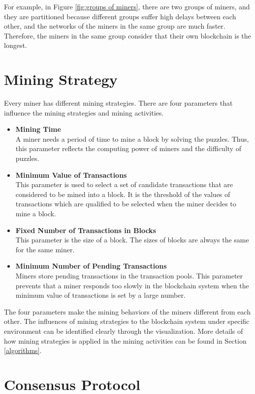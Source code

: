 For example, in Figure \ref{fig:groups of miners}, there are two groups of miners, and they are partitioned because different groups suffer high delays between each other, and the networks of the miners in the same group are much faster. Therefore, the miners in the same group consider that their own blockchain is the longest.

\section{Mining Strategy}

Every miner has different mining strategies. There are four parameters that influence the mining strategies and mining activities. 

\begin{itemize}
    \item \textbf{Mining Time} \\
        A miner needs a period of time to mine a block by solving the puzzles. Thus, this parameter reflects the computing power of miners and the difficulty of puzzles.
    \item \textbf{Minimum Value of Transactions} \\
        This parameter is used to select a set of candidate transactions that are considered to be mined into a block. It is the threshold of the values of transactions which are qualified to be selected when the miner decides to mine a block.
    \item \textbf{Fixed Number of Transactions in Blocks} \\
        This parameter is the size of a block. The sizes of blocks are always the same for the same miner.
    \item \textbf{Minimum Number of Pending Transactions} \\
        Miners store pending transactions in the transaction pools. This parameter prevents that a miner responds too slowly in the blockchain system when the minimum value of transactions is set by a large number.
\end{itemize}

The four parameters make the mining behaviors of the miners different from each other. The influences of mining strategies to the blockchain system under specific environment can be identified clearly through the visualization. More details of how mining strategies is applied in the mining activities can be found in Section \ref{algorithms}.

\section{Consensus Protocol}

